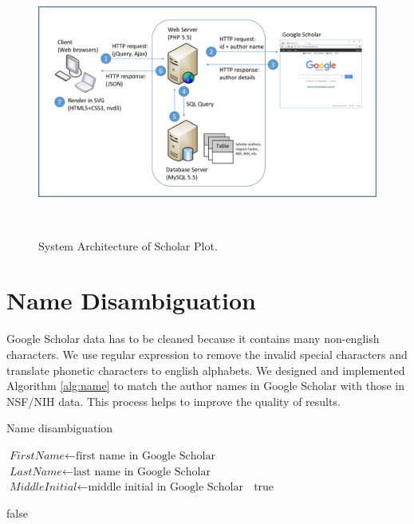 \begin{figure}
\centering
  \includegraphics[width=1\columnwidth]{figures/fig_system_architecture.pdf}
  \caption{System Architecture of Scholar Plot.}~\label{fig:fig-arch}
\end{figure}


\section{Name Disambiguation}
Google Scholar data has to be cleaned because it contains many non-english characters. We use regular expression to remove the invalid special characters and translate phonetic characters to english alphabets. We designed and implemented Algorithm \ref{alg:name} to match the author names in Google Scholar with those in NSF/NIH data. This process helps to improve the quality of results. 

\begin{algorithm}
\caption{Name disambiguation}\label{alg:name}
\begin{algorithmic}[1]
\State $\textit{FirstName} \gets \text{first name in Google Scholar }$
\State $\textit{LastName} \gets \text{last name in Google Scholar }$
\State $\textit{MiddleInitial} \gets \text{middle initial in Google Scholar }$
{\Return true}
\EndIf
\EndIf
\EndIf

\Return false
\EndProcedure
\end{algorithmic}
\end{algorithm}




